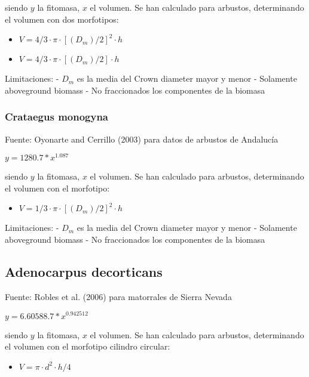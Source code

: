 \documentclass[]{article}
\providecommand{\tightlist}{%
  \setlength{\itemsep}{0pt}\setlength{\parskip}{0pt}}
\begin{document}
siendo \(y\) la fitomasa, \(x\) el volumen. Se han calculado para
arbustos, determinando el volumen con dos morfotipos:

\begin{itemize}
\tightlist
\item
  \(V = 4/3\cdot \pi \cdot [(D_m)/2]^2 \cdot h\)
\item
  \(V = 4/3\cdot \pi \cdot [(D_m)/2] \cdot h\)
\end{itemize}

Limitaciones: - \(D_m\) es la media del Crown diameter mayor y menor -
Solamente aboveground biomass - No fraccionados los componentes de la
biomasa

\hypertarget{crataegus-monogyna}{%
\subsubsection{Crataegus monogyna}\label{crataegus-monogyna}}

Fuente: Oyonarte and Cerrillo (2003) para datos de arbustos de Andalucía

\(y = 1280.7 * x^{1.087}\)

siendo \(y\) la fitomasa, \(x\) el volumen. Se han calculado para
arbustos, determinando el volumen con el morfotipo:

\begin{itemize}
\tightlist
\item
  \(V = 1/3\cdot \pi \cdot [(D_m)/2]^2 \cdot h\)
\end{itemize}

Limitaciones: - \(D_m\) es la media del Crown diameter mayor y menor -
Solamente aboveground biomass - No fraccionados los componentes de la
biomasa

\hypertarget{adenocarpus-decorticans}{%
\subsection{Adenocarpus decorticans}\label{adenocarpus-decorticans}}

Fuente: Robles et al. (2006) para matorrales de Sierra Nevada

\(y = 6.60588.7 * x^{0.942512}\)

siendo \(y\) la fitomasa, \(x\) el volumen. Se han calculado para
arbustos, determinando el volumen con el morfotipo cilindro circular:

\begin{itemize}
\tightlist
\item
  \(V = \pi \cdot d^2 \cdot h/4\)
\end{itemize}
\end{document}
